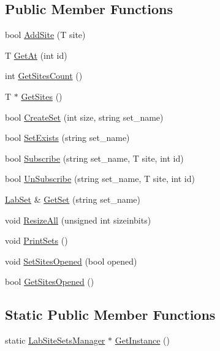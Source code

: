 \subsection*{Public Member Functions}
\begin{DoxyCompactItemize}
\item 
bool \hyperlink{classelps_1_1_lab_site_sets_manager_a34d98ab4bd9acb211554e3e74df45a8e}{Add\+Site} (T site)
\item 
T \hyperlink{classelps_1_1_lab_site_sets_manager_a6a680225fb242511febc7c8b3744999d}{Get\+At} (int id)
\item 
int \hyperlink{classelps_1_1_lab_site_sets_manager_ae1a1c7f294e72ff13c9ce916da2018ca}{Get\+Sites\+Count} ()
\item 
T $\ast$ \hyperlink{classelps_1_1_lab_site_sets_manager_a0cbf9727cd842b794b2162b38645e22f}{Get\+Sites} ()
\item 
bool \hyperlink{classelps_1_1_lab_site_sets_manager_a077de5280216e9c88d3f3951c5279267}{Create\+Set} (int size, string set\+\_\+name)
\item 
bool \hyperlink{classelps_1_1_lab_site_sets_manager_a99c38ab7a53c86daf904f02f02082c3d}{Set\+Exists} (string set\+\_\+name)
\item 
bool \hyperlink{classelps_1_1_lab_site_sets_manager_a1e73a471cca97bd8390456d14874b216}{Subscribe} (string set\+\_\+name, T site, int id)
\item 
bool \hyperlink{classelps_1_1_lab_site_sets_manager_ac2aca3fd7528936b3e45b623233e2aad}{Un\+Subscribe} (string set\+\_\+name, T site, int id)
\item 
\hyperlink{classelps_1_1_lab_set}{Lab\+Set} \& \hyperlink{classelps_1_1_lab_site_sets_manager_afe37396c61581c3231275cbaff7cdf33}{Get\+Set} (string set\+\_\+name)
\item 
void \hyperlink{classelps_1_1_lab_site_sets_manager_a6b8494946043eacf4a1f0a68fac74f17}{Resize\+All} (unsigned int sizeinbits)
\item 
void \hyperlink{classelps_1_1_lab_site_sets_manager_aab41abb0cb85f370dab025cced0cc312}{Print\+Sets} ()
\item 
void \hyperlink{classelps_1_1_lab_site_sets_manager_a6f0b3b81d8c2e6b77447db96ec072425}{Set\+Sites\+Opened} (bool opened)
\item 
bool \hyperlink{classelps_1_1_lab_site_sets_manager_a898f1221f123a0149976c5d40db51d85}{Get\+Sites\+Opened} ()
\end{DoxyCompactItemize}
\subsection*{Static Public Member Functions}
\begin{DoxyCompactItemize}
\item 
static \hyperlink{classelps_1_1_lab_site_sets_manager}{Lab\+Site\+Sets\+Manager} $\ast$ \hyperlink{classelps_1_1_lab_site_sets_manager_a754fd5ab676c7e0e68f2fba7d1263c5d}{Get\+Instance} ()
\end{DoxyCompactItemize}



